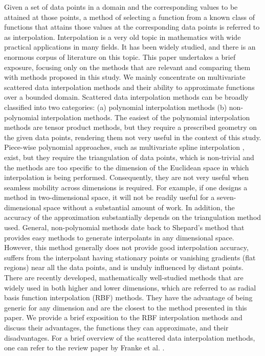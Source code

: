 \documentclass[multixcb]{amstext-l}
\theoremstyle{plain}
\theoremstyle{definition}
\theoremstyle{definition}
\theoremstyle{remark}
\numberwithin{equation}{chapter}
\begin{document}
Given a set of data points in a domain and the corresponding values to be attained at those points, a method of selecting a function from a known class of functions that attains those values at the corresponding data points is referred to as interpolation. Interpolation is a very old topic in mathematics with wide practical applications in many fields. It has been widely studied, and there is an enormous corpus of literature on this topic. This paper undertakes a brief exposure, focusing only on the methods that are relevant and comparing them with methods proposed in this study. We mainly concentrate on multivariate scattered data interpolation methods and their ability to approximate functions over a bounded domain. Scattered data interpolation methods can be broadly classified into two categories: (a) polynomial interpolation methods \cite{gasca2000polynomial, de1990multivariate} (b) non-polynomial interpolation methods. The easiest of the polynomial interpolation methods are tensor product methods, but they require a prescribed geometry on the given data points, rendering them not very useful in the context of this study. Piece-wise polynomial approaches, such as multivariate spline interpolation \cite{de1983approximation}, exist, but they require the triangulation of data points, which is non-trivial and the methods are too specific to the dimension of the Euclidean space in which interpolation is being performed. Consequently, they are not very useful when seamless mobility across dimensions is required. For example, if one designs a method in two-dimensional space, it will not be readily useful for a seven-dimensional space without a substantial amount of work. In addition, the accuracy of the approximation substantially depends on the triangulation method used. General, non-polynomial methods date back to Shepard's method \cite{10.1145/800186.810616, gordon1978shepard} that provides easy methods to generate interpolants in any dimensional space. However, this method generally does not provide good interpolation accuracy, suffers from the interpolant having stationary points or vanishing gradients (flat regions) near all the data points, and is unduly influenced by distant points. There are recently developed, mathematically well-studied methods that are widely used in both higher and lower dimensions, which are referred to as radial basis function interpolation (RBF) methods. They have the advantage of being generic for any dimension and are the closest to the method presented in this paper. We provide a brief exposition to the RBF interpolation methods and discuss their advantages, the functions they can approximate, and their disadvantages. For a brief overview of the scattered data interpolation methods, one can refer to the review paper by Franke et al. \cite{franke1991scattered}.
\end{document}
